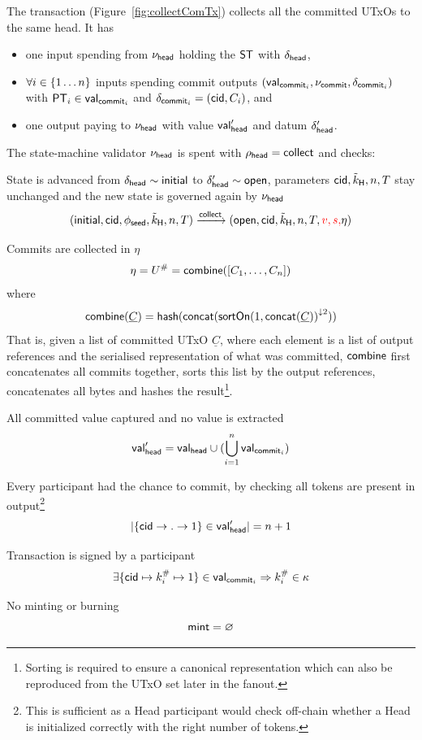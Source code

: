 \noindent The \mtxCCom{} transaction (Figure~\ref{fig:collectComTx}) collects
all the committed UTxOs to the same head. It has
\begin{itemize}
	\item one input spending from $\nu_\mathsf{head}$ holding the $\mathsf{ST}$ with $\delta_{\mathsf{head}}$,
	\item $\forall i \in \{1 \dots n\}$ inputs spending commit outputs
	      $(\mathsf{val}_{\mathsf{commit}_{i}}, \nu_{\mathsf{commit}}, \delta_{\mathsf{commit}_{i}})$ with $\mathsf{PT}_{i} \in \mathsf{val}_{\mathsf{commit}_{i}}$
	      and $\delta_{\mathsf{commit}_{i}} = (\mathsf{cid}, C_{i})$, and
	\item one output paying to $\nu_\mathsf{head}$ with value $\mathsf{val}_{\mathsf{head}}'$ and
	      datum $\delta_{\mathsf{head}}'$.
\end{itemize}

\noindent The state-machine validator $\nu_\mathsf{head}$ is spent with
$\rho_{\mathsf{head}} = \mathsf{collect}$ and checks:
\begin{menumerate}
	\item State is advanced from $\delta_{\mathsf{head}} \sim \mathsf{initial}$ to
	$\delta_{\mathsf{head}}' \sim \mathsf{open}$, parameters $\mathsf{cid},\tilde{k}_{\mathsf{H}},n,T$ stay
	unchanged and the new state is governed again by $\nu_\mathsf{head}$
	\[
		(\mathsf{initial},\mathsf{cid},\phi_{\mathsf{seed}},\tilde{k}_{\mathsf{H}},n,T) \xrightarrow{\mathsf{collect}} (\mathsf{open},\mathsf{cid},\tilde{k}_{\mathsf{H}},n,T,\textcolor{red}{v,s,}\eta)
	\]
	\item Commits are collected in $\eta$
	\[
		\eta = U^{\#} = \mathsf{combine}([C_{1}, \dots, C_{n}])
	\]
	where
	\[
		\mathsf{combine}(\underline{C}) = \mathsf{hash}(\mathsf{concat}({\mathsf{sortOn}(1, \mathsf{concat}(\underline{C}))}^{\downarrow2}))
	\]
	That is, given a list of committed UTxO $\underline{C}$, where each element is
	a list of output references and the serialised representation of what was
	committed, $\mathsf{combine}$ first concatenates all commits together, sorts this list
	by the output references, concatenates all bytes and hashes the
	result\footnote{Sorting is required to ensure a canonical representation which
		can also be reproduced from the UTxO set later in the fanout.}.

	\item All committed value captured and no value is extracted
	\[
		\mathsf{val}_{\mathsf{head}}' = \mathsf{val}_{\mathsf{head}} \cup (\bigcup_{i=1}^{n} \mathsf{val}_{\mathsf{commit}_{i}})
	\]
	\item Every participant had the chance to commit, by checking all tokens are
	present in output\footnote{This is sufficient as a Head participant would
		check off-chain whether a Head is initialized correctly with the right
		number of tokens.}
	\[
		|\{\mathsf{cid} \rightarrow . \rightarrow 1\} \in \mathsf{val}_{\mathsf{head}}'| = n + 1
	\]
	\item Transaction is signed by a participant
	\[
		\exists \{\mathsf{cid} \mapsto k^{\#}_{i} \mapsto 1\} \in \mathsf{val}_{\mathsf{commit}_{i}} \Rightarrow k^{\#}_{i} \in \kappa
	\]
	\item No minting or burning
	\[
		\mathsf{mint} = \varnothing
	\]
\end{menumerate}


